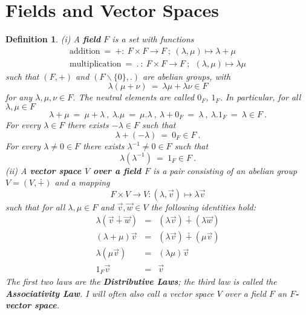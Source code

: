 \documentclass[11pt]{amsbook}
\newtheorem{definition}[theorem]{Definition}
\theoremstyle{definition}
\begin{document}
\section{Fields and Vector Spaces}
\begin{definition} \label{vsdef}
{\rm (i)} A {\bf field} $F$  is a set with functions
$$\begin{array}{l}
\text{addition}~=~+:~ F \times F \to F~;~(\lambda,\mu) \mapsto \lambda+\mu\\[1ex]
\text{multiplication}~=~.~:~F \times F \to F~;~~(\lambda,\mu) \mapsto \lambda\mu
\end{array}$$
such that $(F,+)$ and $(F \backslash \{0\},.)$ are abelian groups, with
$$\lambda(\mu+\nu)~=~\lambda \mu +\lambda\nu \in F$$
for any $\lambda,\mu,\nu \in F$. The neutral elements are called $0_F$,
$1_F$. In particular, for all $\lambda,\mu \in F$
$$\lambda + \mu ~=~\mu+\lambda~,~\lambda. \mu~=~\mu. \lambda~,~
\lambda+0_F~=~\lambda~,~\lambda.1_F~=~\lambda \in F~.$$
For every $\lambda \in F$ there  exists $-\lambda \in F$ such that
$$\lambda+(-\lambda)~=~0_F \in F~.$$
For every $\lambda\neq 0 \in F$ there  exists $\lambda^{-1}\neq 0 \in F$ such that
$$\lambda(\lambda^{-1})~=~1_F \in F~.$$
{\rm (ii)}   A {\bf vector space $V$ over a field $F$} is a pair consisting of an abelian group $V = (V,\dotplus)$ and a mapping
$$F\times V  \to V \colon  (\lambda , \vec{v})\mapsto \lambda \vec{v}$$
such that for all $\lambda, \mu \in F$ and $\vec{v}, \vec{w} \in V$ the following identities hold:
\begin{eqnarray*}
\lambda (\vec{v}\dotplus \vec{w}) &=& (\lambda \vec{v}) \dotplus (\lambda \vec{w}) \\ (\lambda + \mu) \vec{v} &=& (\lambda \vec{v}) \dotplus (\mu \vec{v}) \\ \lambda( \mu \vec{v}) &=& (\lambda \mu) \vec{v} \\ 1_F \vec{v} &=& \vec{v}
\end{eqnarray*}
The first two laws are the {\bf Distributive Laws}; the third law is called the {\bf Associativity Law}. I will often also call a vector space $V$ over a field $F$ an {\bf $F$-vector space}.
\end{definition}
\medskip
\end{document}
